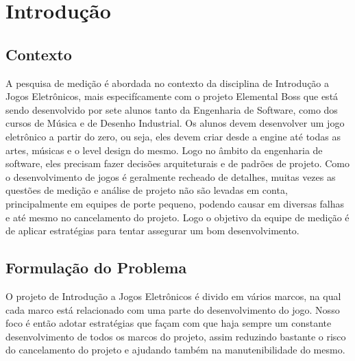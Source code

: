 \chapter{Introdução}

\section{Contexto}
	
	A pesquisa de medição é abordada no contexto da disciplina de Introdução a Jogos Eletrônicos, mais especifícamente com o projeto Elemental Boss que está sendo desenvolvido por sete alunos tanto da Engenharia de Software, como dos cursos de Música e de Desenho Industrial. Os alunos devem desenvolver um jogo eletrônico a partir do zero, ou seja, eles devem criar desde a engine até todas as artes, músicas e o level design do mesmo. Logo no âmbito da engenharia de software, eles precisam fazer decisões arquiteturais e de padrões de projeto.
	Como o desenvolvimento de jogos é geralmente recheado de detalhes, muitas vezes as questões de medição e análise de projeto não são levadas em conta, principalmente em equipes de porte pequeno, podendo causar em diversas falhas e até mesmo no cancelamento do projeto. Logo o objetivo da equipe de medição é de aplicar estratégias para tentar assegurar um bom desenvolvimento.

\section{Formulação do Problema}

	O projeto de Introdução a Jogos Eletrônicos é divido em vários marcos, na qual cada marco está relacionado com uma parte do desenvolvimento do jogo. Nosso foco é então adotar estratégias que façam com que haja sempre um constante desenvolvimento de todos os marcos do projeto, assim reduzindo bastante o risco do cancelamento do projeto e ajudando também na manutenibilidade do mesmo.


  
